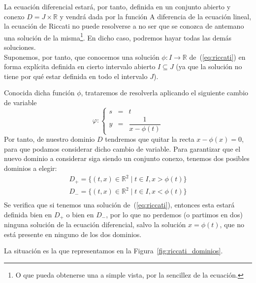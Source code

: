 La ecuación diferencial estará, por tanto, definida en un conjunto abierto y conexo $D=J\times \mathbb{R}$ y vendrá dada por la función
A diferencia de la ecuación lineal, la ecuación de Riccati no puede resolverse a no ser que se conozca de antemano una solución de la misma\footnote{O que pueda obtenerse una a simple vista, por la sencillez de la ecuación.}. En dicho caso, podremos hayar todas las demás soluciones.\\

\noindent
Suponemos, por tanto, que conocemos una solución $\phi:I\rightarrow\mathbb{R}$ de~(\ref{eq:riccati}) en forma explícita definida en cierto intervalo abierto $I\subseteq J$ (ya que la solución no tiene por qué estar definida en todo el intervalo $J$). 

Conocida dicha función $\phi$, trataremos de resolverla aplicando el siguiente cambio de variable
\begin{equation*}
    \varphi: \left\{\begin{array}{rcl}
            s &= &t \\
            y &= &\dfrac{1}{x-\phi(t)}
    \end{array}\right.
\end{equation*}
Por tanto, de nuestro dominio $D$ tendremos que quitar la recta $x-\phi(x) = 0$, para que podamos considerar dicho cambio de variable. Para garantizar que el nuevo dominio a considerar siga siendo un conjunto conexo, tenemos dos posibles dominios a elegir:
\begin{gather*}
    D_+ = \{(t,x)\in \mathbb{R}^2 \mid t\in I, x> \phi(t)\} \\
    D_- = \{(t,x)\in \mathbb{R}^2 \mid t\in I, x< \phi(t)\} \\
\end{gather*}
Se verifica que si tenemos una solución de~(\ref{eq:riccati}), entonces esta estará definida bien en $D_+$ o bien en $D_-$, por lo que no perdemos (o partimos en dos) ninguna solución de la ecuación diferencial, salvo la solución $x=\phi(t)$, que no está presente en ninguno de los dos dominios.

La situación es la que representamos en la Figura~\ref{fig:riccati_dominios}.

